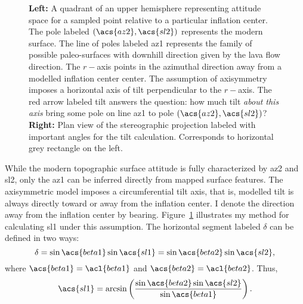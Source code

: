 \begin{figure}
\begin{center}
    \hspace{1cm}%
    \caption[\Acl{tilt} from mapping]{\textbf{Left:} A quadrant of an upper hemisphere representing attitude space for a sampled point relative to a particular inflation center. The pole labeled $\left(\acs{az2},\acs{sl2}\right)$ represents the modern surface. The line of poles labeled \acs{az1} represents the family of possible paleo-surfaces with downhill direction given by the lava flow direction. The $r-$axis points in the azimuthal direction away from a modelled inflation center \acs{center}. The assumption of axisymmetry imposes a horizontal axis of tilt perpendicular to the $r-$axis. The red arrow labeled \acs{tilt} answers the question: how much tilt \emph{about this axis} bring some pole on line \acs{az1} to pole $\left(\acs{az2},\acs{sl2}\right)$? \textbf{Right:} Plan view of the stereographic projection labeled with important angles for the tilt calculation. Corresponds to horizontal grey rectangle on the left.}%
    \label{fig:tilt-from-map}%
\end{center}
\end{figure}
While the modern topographic surface attitude is fully characterized by \acs{az2} and \acs{sl2}, only the \acf{az1} can be inferred directly from mapped surface features. The axisymmetric model imposes a circumferential tilt axis, that is, modelled tilt is always directly toward or away from the inflation center. I denote the direction away from the inflation center by \acs{bearing}. Figure~\ref{fig:tilt-from-map} illustrates my method for calculating \acf{sl1} under this assumption. The horizontal segment labeled $\delta$ can be defined in two ways:
\begin{equation*}
    \delta = \sin\acs{beta1}\sin\acs{sl1} = \sin\acs{beta2}\sin\acs{sl2},
\end{equation*}
where $\acs{beta1} = \acl{beta1}$ and $\acs{beta2} = \acl{beta2}$. Thus,
\begin{equation}
    \acs{sl1} = \arcsin\left(\frac{\sin\acs{beta2}\sin\acs{sl2}}{\sin\acs{beta1}}\right).\label{eq:sl1}
\end{equation}
